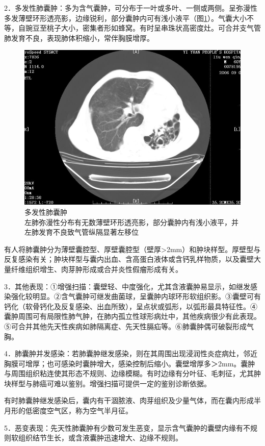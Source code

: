 2．多发性肺囊肿：多为含气囊肿，可分布于一叶或多叶、一侧或两侧。呈弥漫性多发薄壁环形透亮影，边缘锐利，部分囊肿内可有浅小液平（图\ref{fig9-4}）。气囊大小不等，自豌豆至桃子大小，密集者形如蜂窝。有时呈串珠状高密度灶。可合并支气管肺发育不良，表现肺体积缩小，常伴胸膜增厚。

\begin{figure}[!htbp]
 \centering
 \includegraphics[width=.7\textwidth,height=\textheight,keepaspectratio]{./images/Image00187.jpg}
 \captionsetup{justification=centering}
 \caption{多发性肺囊肿\\{\small 左肺弥漫性分布有无数薄壁环形透亮影，部分囊肿内有浅小液平，并左肺发育不良致气管纵隔显著左移位}}
 \label{fig9-4}
  \end{figure} 

有人将肺囊肿分为薄壁囊腔型、厚壁囊腔型（壁厚\textgreater{}2mm）和肿块样型。厚壁型与反复感染有关；肿块样型与囊内出血、含高蛋白液体或含钙乳样物质，以及囊壁大量纤维组织增生、肉芽肿形成或合并炎性假瘤形成有关。

3．其他表现：①增强扫描：囊壁轻、中度强化，尤其含液囊肿易显示，如继发感染强化较明显。②含气囊肿可继发曲菌球，呈囊肿内球环形软组织影。③囊壁可有钙化（软骨钙化及反复感染、出血所致），呈点状或弧形，以弧形最具特征性。④囊肿周围可有局限性肺气肿，在肺内孤立性球形病灶中，其他疾病很少有此表现。⑤可合并其他先天性疾病如肺隔离症、先天性膈疝等。⑥肺囊肿偶可破裂形成气胸。

4．肺囊肿并发感染：若肺囊肿继发感染，则在其周围出现浸润性炎症病灶，邻近胸膜可增厚；也可感染时囊肿增大，感染控制后缩小。囊壁增厚多＞2mm。囊肿与周围组织粘连使其形态不规则、边缘模糊。有时边缘有分叶征、毛刺征，尤其肿块样型与肺癌可难以鉴别。增强扫描可提供一定的鉴别诊断依据。

有时肺囊肿继发感染后，囊内有干涸脓液、肉芽组织及少量气体，而在囊内形成半月形的低密度空气区，称为空气半月征。

5．恶变表现：先天性肺囊肿有少数可发生恶变，显示含气囊肿的囊壁内缘有不规则软组织结节生长，或含液囊肿迅速增大、边缘不规则。

